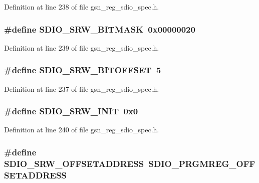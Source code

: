 Definition at line 238 of file gsn\_\-reg\_\-sdio\_\-spec.h.

\hypertarget{a00571_a6a834febf301d6ad6ad4380a7ce86ef6}{
\subsubsection[{SDIO\_\-SRW\_\-BITMASK}]{\setlength{\rightskip}{0pt plus 5cm}\#define SDIO\_\-SRW\_\-BITMASK~0x00000020}}
\label{a00571_a6a834febf301d6ad6ad4380a7ce86ef6}


Definition at line 239 of file gsn\_\-reg\_\-sdio\_\-spec.h.

\hypertarget{a00571_a81b2c5ce7c848f2d38a0ee0c2b8301f8}{
\subsubsection[{SDIO\_\-SRW\_\-BITOFFSET}]{\setlength{\rightskip}{0pt plus 5cm}\#define SDIO\_\-SRW\_\-BITOFFSET~5}}
\label{a00571_a81b2c5ce7c848f2d38a0ee0c2b8301f8}


Definition at line 237 of file gsn\_\-reg\_\-sdio\_\-spec.h.

\hypertarget{a00571_a8bb710f02e13a9c97e452ac3149b7b9c}{
\subsubsection[{SDIO\_\-SRW\_\-INIT}]{\setlength{\rightskip}{0pt plus 5cm}\#define SDIO\_\-SRW\_\-INIT~0x0}}
\label{a00571_a8bb710f02e13a9c97e452ac3149b7b9c}


Definition at line 240 of file gsn\_\-reg\_\-sdio\_\-spec.h.

\hypertarget{a00571_a4a6e4534ff267ad0a80fad558c58a965}{
\subsubsection[{SDIO\_\-SRW\_\-OFFSETADDRESS}]{\setlength{\rightskip}{0pt plus 5cm}\#define SDIO\_\-SRW\_\-OFFSETADDRESS~SDIO\_\-PRGMREG\_\-OFFSETADDRESS}}
\label{a00571_a4a6e4534ff267ad0a80fad558c58a965}


